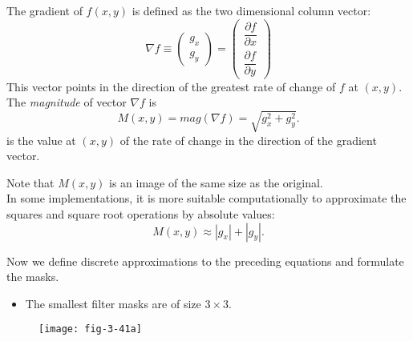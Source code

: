 \begin{frame}
The gradient of $f(x,y)$ is defined 	as the two dimensional column vector:
\begin{equation}
\nabla f \equiv \left (
\begin{array}{c}
g_{x}\\
g_{y}
\end{array}
\right ) =
\left (
\begin{array}{c}
\dfrac{\partial f}{\partial x}\\
\dfrac{\partial f}{\partial y}
\end{array}
\right )
\end{equation}
This vector points in the direction of the greatest rate of change of $f$ at $(x, y)$.\\
The \textit{magnitude} of vector $\nabla f$ is
\begin{equation}
M(x,y) = mag(\nabla f) = \sqrt{g_{x}^{2} + g_{y}^{2}}.
\end{equation}
is the value at $(x, y)$ of the rate of change in the direction of the gradient vector.
\end{frame}


\begin{frame}
Note that $M(x, y)$ is an image of the same size as the original.\\
In some implementations, it is more suitable computationally to approximate the squares and square root operations by absolute values:
\begin{equation}
M(x,y) \approx |g_{x}| + |g_{y}|.
\end{equation}
\end{frame}


\begin{frame}
Now we define discrete approximations to the preceding equations and formulate the masks.
\begin{itemize}
\item The smallest filter masks are of
size $3\times 3$.
\end{itemize}
\begin{figure}
\centering
\texttt{[image: fig-3-41a]}
\end{figure}
\end{frame}

